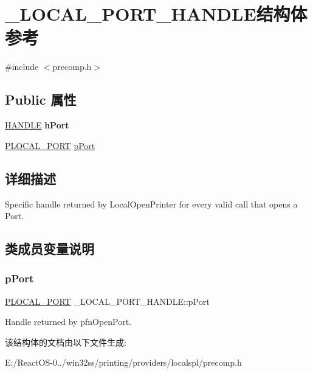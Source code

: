 \hypertarget{struct___l_o_c_a_l___p_o_r_t___h_a_n_d_l_e}{}\section{\+\_\+\+L\+O\+C\+A\+L\+\_\+\+P\+O\+R\+T\+\_\+\+H\+A\+N\+D\+L\+E结构体 参考}
\label{struct___l_o_c_a_l___p_o_r_t___h_a_n_d_l_e}


{\ttfamily \#include $<$precomp.\+h$>$}

\subsection*{Public 属性}
\begin{DoxyCompactItemize}
\item 
\mbox{\label{struct___l_o_c_a_l___p_o_r_t___h_a_n_d_l_e_a13cc69dc07ef6b801a739bbb6ce3a338}} 
\hyperlink{interfacevoid}{H\+A\+N\+D\+LE} {\bfseries h\+Port}
\item 
\hyperlink{struct___l_o_c_a_l___p_o_r_t}{P\+L\+O\+C\+A\+L\+\_\+\+P\+O\+RT} \hyperlink{struct___l_o_c_a_l___p_o_r_t___h_a_n_d_l_e_a412770184fe30d1ca190f8cb0a9bdfa9}{p\+Port}
\end{DoxyCompactItemize}


\subsection{详细描述}
Specific handle returned by Local\+Open\+Printer for every valid call that opens a Port. 

\subsection{类成员变量说明}
\mbox{\label{struct___l_o_c_a_l___p_o_r_t___h_a_n_d_l_e_a412770184fe30d1ca190f8cb0a9bdfa9}} 
\subsubsection{\texorpdfstring{p\+Port}{pPort}}
{\footnotesize\ttfamily \hyperlink{struct___l_o_c_a_l___p_o_r_t}{P\+L\+O\+C\+A\+L\+\_\+\+P\+O\+RT} \+\_\+\+L\+O\+C\+A\+L\+\_\+\+P\+O\+R\+T\+\_\+\+H\+A\+N\+D\+L\+E\+::p\+Port}

Handle returned by pfn\+Open\+Port. 

该结构体的文档由以下文件生成\+:\begin{DoxyCompactItemize}
\item 
E\+:/\+React\+O\+S-\/0../win32ss/printing/providers/localspl/precomp.\+h\end{DoxyCompactItemize}
